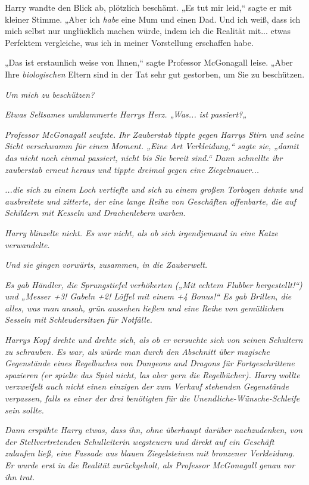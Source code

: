 {Harry wandte den Blick ab, plötzlich beschämt. „Es tut mir leid,“ sagte er mit kleiner Stimme. „Aber ich \emph{habe} eine Mum und einen Dad. Und ich weiß, dass ich mich selbst nur unglücklich machen würde, indem ich die Realität mit... etwas Perfektem vergleiche, was ich in meiner Vorstellung erschaffen habe.

„Das ist erstaunlich weise von Ihnen,“ sagte Professor McGonagall leise. „Aber Ihre \emph{biologischen} Eltern sind in der Tat sehr gut gestorben, um Sie zu beschützen.

\emph{Um mich zu beschützen?}

\emph{Etwas Seltsames umklammerte Harrys Herz. „Was...} \emph{\emph{ist}} \emph{passiert?„}

\emph{Professor McGonagall seufzte. Ihr Zauberstab tippte gegen Harrys Stirn und seine Sicht verschwamm für einen Moment. „Eine Art Verkleidung,“ sagte sie, „damit das nicht noch einmal passiert, nicht bis Sie bereit sind.“ Dann schnellte ihr zauberstab erneut heraus und tippte dreimal gegen eine Ziegelmauer...}

\emph{...die sich zu einem Loch vertiefte und sich zu einem großen Torbogen dehnte und ausbreitete und zitterte, der eine lange Reihe von Geschäften offenbarte, die auf Schildern mit Kesseln und Drachenlebern warben.}

\emph{Harry blinzelte nicht. Es war nicht, als ob sich irgendjemand in eine Katze verwandelte.}

\emph{Und sie gingen vorwärts, zusammen, in die Zauberwelt.}

\emph{Es gab Händler, die Sprungstiefel verhökerten („Mit echtem Flubber hergestellt!“) und „Messer +3! Gabeln +2! Löffel mit einem +4 Bonus!“ Es gab Brillen, die alles, was man ansah, grün aussehen ließen und eine Reihe von gemütlichen Sesseln mit Schleudersitzen für Notfälle.}

\emph{Harrys Kopf drehte und drehte sich, als ob er versuchte sich von seinen Schultern zu schrauben. Es war, als würde man durch den Abschnitt über magische Gegenstände eines Regelbuches von} \emph{\emph{Dungeons and Dragons für Fortgeschrittene}} \emph{spazieren (er spielte das Spiel nicht, las aber gern die Regelbücher). Harry wollte verzweifelt auch nicht einen einzigen der zum Verkauf stehenden Gegenstände verpassen, falls es einer der drei benötigten für die} \emph{Unendliche-Wünsche-Schleife} \emph{sein sollte.}

\emph{Dann erspähte Harry etwas, dass ihn, ohne überhaupt darüber nachzudenken, von der Stellvertretenden Schulleiterin wegsteuern und direkt auf ein Geschäft zulaufen ließ, eine Fassade aus blauen Ziegelsteinen mit bronzener Verkleidung. Er wurde erst in die Realität zurückgeholt, als Professor McGonagall genau vor ihn trat.}

}
